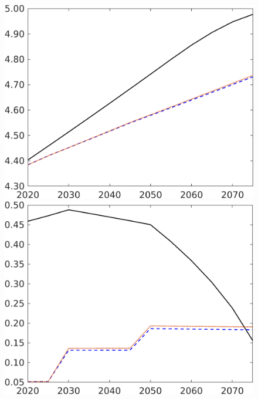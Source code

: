 \begin{figure}[h!!]
\begin{minipage}[]{0.32\textwidth}
	\end{minipage}
	\begin{minipage}[]{0.32\textwidth}
		\includegraphics[width=1\textwidth]{../../codding_model/own_basedOnFried/optimalPol_elastS_DisuSci/figures/all_1705/An_CompEffOPT_T_NoTaus_spillover0_noskill1_sep1_BN0_ineq0_red0_etaa0.79_lgd0.png}
	\end{minipage}
	\begin{minipage}[]{0.32\textwidth}
		\includegraphics[width=1\textwidth]{../../codding_model/own_basedOnFried/optimalPol_elastS_DisuSci/figures/all_1705/sg_CompEffOPT_T_NoTaus_spillover0_noskill1_sep1_BN0_ineq0_red0_etaa0.79_lgd0.png}

\end{minipage}
\end{figure}
